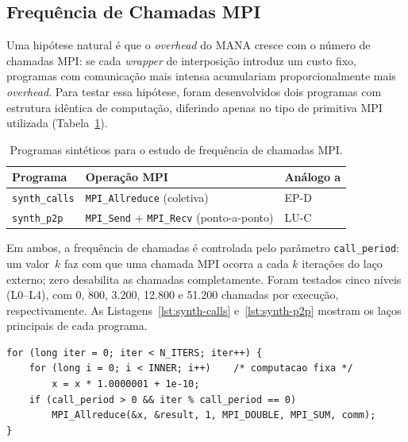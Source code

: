 \subsection{Frequência de Chamadas MPI}
\label{sec:sintetico-calls}

Uma hipótese natural é que o \textit{overhead} do MANA cresce com o número de chamadas
MPI: se cada \textit{wrapper} de interposição introduz um custo fixo, programas com
comunicação mais intensa acumulariam proporcionalmente mais \textit{overhead}. Para
testar essa hipótese, foram desenvolvidos dois programas com estrutura idêntica de
computação, diferindo apenas no tipo de primitiva MPI utilizada
(Tabela~\ref{tab:desc-calls}).

\begin{table}[htb]
  \caption{Programas sintéticos para o estudo de frequência de chamadas MPI.}
  \label{tab:desc-calls}
  \centering
  \begin{tabular}{lll}
    \toprule
    Programa & Operação MPI & Análogo a \\
    \midrule
    \texttt{synth\_calls} & \texttt{MPI\_Allreduce} (coletiva)                       & EP-D \\
    \texttt{synth\_p2p}   & \texttt{MPI\_Send} + \texttt{MPI\_Recv} (ponto-a-ponto) & LU-C \\
    \bottomrule
  \end{tabular}
\end{table}

Em ambos, a frequência de chamadas é controlada pelo parâmetro \texttt{call\_period}:
um valor~$k$ faz com que uma chamada MPI ocorra a cada $k$ iterações do laço externo;
zero desabilita as chamadas completamente. Foram testados cinco níveis (L0--L4), com
0, 800, 3.200, 12.800 e 51.200 chamadas por execução, respectivamente. As
Listagens~\ref{lst:synth-calls} e~\ref{lst:synth-p2p} mostram os laços principais de
cada programa.

\begin{listing}[htb]
  \caption{\texttt{synth\_calls}: laço com \texttt{MPI\_Allreduce} em frequência variável.}
  \label{lst:synth-calls}
  \begin{verbatim}
for (long iter = 0; iter < N_ITERS; iter++) {
    for (long i = 0; i < INNER; i++)    /* computacao fixa */
        x = x * 1.0000001 + 1e-10;
    if (call_period > 0 && iter % call_period == 0)
        MPI_Allreduce(&x, &result, 1, MPI_DOUBLE, MPI_SUM, comm);
}
  \end{verbatim}
\end{listing}

